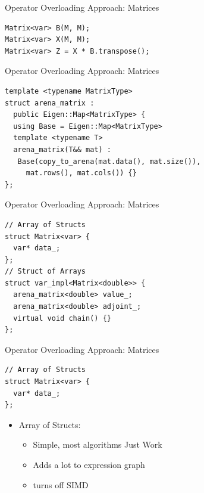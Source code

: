 \documentclass[dvipsnames, aspectratio=169]{beamer}
\begin{document}
\begin{frame}[fragile]{Operator Overloading Approach: Matrices}
\begin{verbatim}
Matrix<var> B(M, M);
Matrix<var> X(M, M);
Matrix<var> Z = X * B.transpose();
\end{verbatim}
\end{frame}

\begin{frame}[fragile]{Operator Overloading Approach: Matrices}
\begin{verbatim}
template <typename MatrixType>
struct arena_matrix :
  public Eigen::Map<MatrixType> {
  using Base = Eigen::Map<MatrixType>
  template <typename T>
  arena_matrix(T&& mat) :
   Base(copy_to_arena(mat.data(), mat.size()),
     mat.rows(), mat.cols()) {}
};
\end{verbatim}
\end{frame}

\begin{frame}[fragile]{Operator Overloading Approach: Matrices}
\begin{verbatim}
// Array of Structs
struct Matrix<var> {
  var* data_;
};
// Struct of Arrays
struct var_impl<Matrix<double>> {
  arena_matrix<double> value_;
  arena_matrix<double> adjoint_;
  virtual void chain() {}
};
\end{verbatim}
\vspace{-8mm}
\end{frame}

\begin{frame}[fragile]{Operator Overloading Approach: Matrices}
\begin{verbatim}
// Array of Structs
struct Matrix<var> {
  var* data_;
};
\end{verbatim}
\begin{itemize}
    \item Array of Structs:
    \begin{itemize}
        \item Simple, most algorithms Just Work\texttrademark
        \item Adds a lot to expression graph
        \item turns off SIMD
    \end{itemize}
\end{itemize}
\end{frame}
\end{document}
